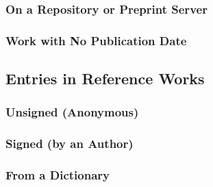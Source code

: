 \documentclass{ltxdockit}
\begin{document}
\subsubsection{On a Repository or Preprint Server} %
\label{sub:on_a_repository_or_preprint_server}
\begin{refsection}
	\printbibliography[heading=none]
\end{refsection}
\subsubsection{Work with No Publication Date} %
\label{sub:work_with_no_publication_date}
\begin{refsection}
	\printbibliography[heading=none]
\end{refsection}

\subsection{Entries in Reference Works} %
\label{sec:entries_in_reference_works}
\subsubsection{Unsigned (Anonymous)} %
\label{sub:unsigned_anonymous}
\begin{refsection}
	\printbibliography[heading=none]
\end{refsection}
\subsubsection{Signed (by an Author)} %
\label{sub:signed_by_an_author}
\begin{refsection}
	\printbibliography[heading=none]
\end{refsection}
\subsubsection{From a Dictionary} %
\label{sub:from_a_dictionary}
\begin{refsection}
	\printbibliography[heading=none]
\end{refsection}
\end{document}
